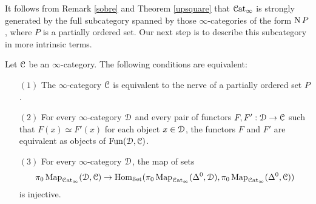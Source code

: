 
It follows from Remark \ref{sobre} and Theorem \ref{upsquare} that $\operatorname{\mathcal{C}at}_{\infty}$ is strongly generated by the full subcategory spanned by those $\infty$-categories of the form $\operatorname{N} P$, where
$P$ is a partially ordered set. Our next step is to describe this subcategory in more intrinsic terms.

\begin{proposition}
Let $\operatorname{\mathcal{C}}$ be an $\infty$-category. The following conditions are equivalent:
\begin{itemize}
\item[$(1)$] The $\infty$-category $\operatorname{\mathcal{C}}$ is equivalent to the nerve of a partially ordered set $P$.
\item[$(2)$] For every $\infty$-category $\operatorname{\mathcal{D}}$ and every pair of functors
$F, F': \operatorname{\mathcal{D}} \rightarrow \operatorname{\mathcal{C}}$ such that $F(x) \simeq F'(x)$ for each object $x \in \operatorname{\mathcal{D}}$, 
the functors $F$ and $F'$ are equivalent as objects of $\operatorname{Fun}(\operatorname{\mathcal{D}}, \operatorname{\mathcal{C}})$.
\item[$(3)$] For every $\infty$-category $\operatorname{\mathcal{D}}$, the map of sets
$$ \pi_0 \operatorname{{Map}}_{\operatorname{\mathcal{C}at}_{\infty}}( \operatorname{\mathcal{D}}, \operatorname{\mathcal{C}})
\rightarrow \operatorname{Hom}_{ \operatorname{\mathcal{S}et}}( \pi_0 \operatorname{{Map}}_{ \operatorname{\mathcal{C}at}_{\infty}}( \Delta^0, \operatorname{\mathcal{D}}),
\pi_0 \operatorname{{Map}}_{ \operatorname{\mathcal{C}at}_{\infty} }( \Delta^0, \operatorname{\mathcal{C}}) )$$
is injective.
\end{itemize}
\end{proposition}

